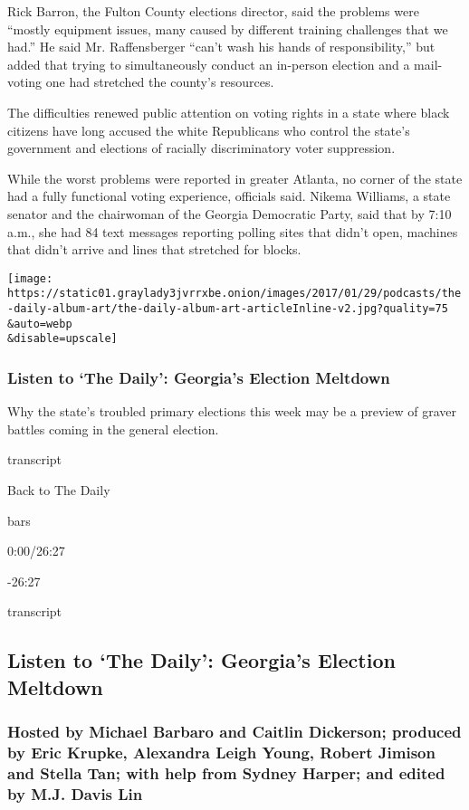 Rick Barron, the Fulton County elections director, said the problems
were ``mostly equipment issues, many caused by different training
challenges that we had.'' He said Mr. Raffensberger ``can't wash his
hands of responsibility,'' but added that trying to simultaneously
conduct an in-person election and a mail-voting one had stretched the
county's resources.

The difficulties renewed public attention on voting rights in a state
where black citizens have long accused the white Republicans who control
the state's government and elections of racially discriminatory voter
suppression.

While the worst problems were reported in greater Atlanta, no corner of
the state had a fully functional voting experience, officials said.
Nikema Williams, a state senator and the chairwoman of the Georgia
Democratic Party, said that by 7:10 a.m., she had 84 text messages
reporting polling sites that didn't open, machines that didn't arrive
and lines that stretched for blocks.

\texttt{[image: https://static01.graylady3jvrrxbe.onion/images/2017/01/29/podcasts/the-daily-album-art/the-daily-album-art-articleInline-v2.jpg?quality=75\\\&auto=webp\\\&disable=upscale]}

\hypertarget{listen-to-the-daily-georgias-election-meltdown}{%
\subsubsection{Listen to `The Daily': Georgia's Election
Meltdown}\label{listen-to-the-daily-georgias-election-meltdown}}

Why the state's troubled primary elections this week may be a preview of
graver battles coming in the general election.

transcript

Back to The Daily

bars

0:00/26:27

-26:27

transcript

\hypertarget{listen-to-the-daily-georgias-election-meltdown-1}{%
\subsection{Listen to `The Daily': Georgia's Election
Meltdown}\label{listen-to-the-daily-georgias-election-meltdown-1}}

\hypertarget{hosted-by-michael-barbaro-and-caitlin-dickerson-produced-by-eric-krupke-alexandra-leigh-young-robert-jimison-and-stella-tan-with-help-from-sydney-harper-and-edited-by-mj-davis-lin}{%
\subsubsection{Hosted by Michael Barbaro and Caitlin Dickerson; produced
by Eric Krupke, Alexandra Leigh Young, Robert Jimison and Stella Tan;
with help from Sydney Harper; and edited by M.J. Davis
Lin}\label{hosted-by-michael-barbaro-and-caitlin-dickerson-produced-by-eric-krupke-alexandra-leigh-young-robert-jimison-and-stella-tan-with-help-from-sydney-harper-and-edited-by-mj-davis-lin}}

